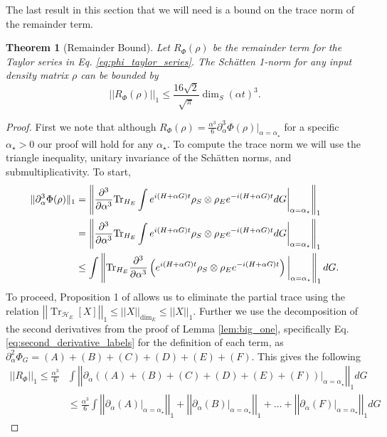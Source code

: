 \documentclass{article}
\newtheorem{theorem}{Theorem}
\newcommand{\brackets}[1]{\left[ #1 \right]}
\newcommand{\norm}[1]{\left| \left| #1 \right| \right|}
\DeclareMathOperator{\Tr}{Tr}
\newcommand{\partrace}[2]{\Tr_{#1} \brackets{ #2 }}
\newcommand{\hilb}{\mathcal{H}}
\begin{document}
The last result in this section that we will need is a bound on the trace norm of the remainder term.
\begin{theorem}[Remainder Bound] \label{lem:remainder_bound}
    Let $R_{\Phi}(\rho)$ be the remainder term for the Taylor series in Eq. \eqref{eq:phi_taylor_series}. The Sch\"{a}tten 1-norm for any input density matrix $\rho$ can be bounded by
    \begin{equation}
        \norm{R_{\Phi}(\rho)}_1 \le \frac{16 \sqrt{2}}{\sqrt{\pi}} \dim_S (\alpha t)^3.
    \end{equation}
\end{theorem}
\begin{proof}
First we note that although $R_{\Phi}(\rho) = \frac{\alpha^3}{6} \partial_{\alpha}^3 \Phi(\rho)\big|_{\alpha = \alpha_{\star}}$ for a specific $ \alpha_{\star} > 0$ our proof will hold for any $\alpha_{\star}$. To compute the trace norm we will use the triangle inequality, unitary invariance of the Sch\"{a}tten norms, and submultiplicativity. To start,
\begin{align}
    \|\partial_\alpha^3 \Phi(\rho) \|_1 &= \left\| \frac{\partial^3}{\partial \alpha^3} {\rm Tr}_{H_E} \int e^{i(H+\alpha G)t} \rho_S \otimes \rho_E e^{-i(H+\alpha G)t} dG \bigg|_{\alpha = \alpha_{\star}} \right\|_1 \nonumber\\
    &= \left\| \frac{\partial^3}{\partial \alpha^3} {\rm Tr}_{H_E} \int e^{i(H+\alpha G)t} \rho_S \otimes \rho_E e^{-i(H+\alpha G)t} dG \bigg|_{\alpha = \alpha_{\star}} \right\|_1 \nonumber\\
    &\le    \int \left\|{\rm Tr}_{H_E}\frac{\partial^3}{\partial \alpha^3}\left( e^{i(H+\alpha G)t} \rho_S \otimes \rho_E e^{-i(H+\alpha G)t}\right) \bigg|_{\alpha = \alpha_{\star}} \right\|_1 dG.\label{eq:3derivBd}
\end{align}
To proceed, Proposition 1 of \cite{rastegin2012relations} allows us to eliminate the partial trace using the relation
$\norm{\partrace{\hilb_E}{X}}_{1} \le \norm{X}_{\dim_E} \le \norm{X}_1$. Further we use the decomposition of the second derivatives from the proof of Lemma \ref{lem:big_one}, specifically Eq. \eqref{eq:second_derivative_labels} for the definition of each term, as $\partial_{\alpha}^2 \Phi_G = (A) + (B) + (C) + (D) +(E) + (F)$. This gives the following 
\begin{align}
    \norm{R_{\Phi}}_1 \le \frac{\alpha^3}{6} &\int \norm{\partial_{\alpha}((A) + (B) + (C) + (D) +(E) + (F)) \big|_{\alpha = \alpha_{\star}} }_1 dG \\
    &\le \frac{\alpha^3}{6} \int \norm{\partial_{\alpha}(A)\big|_{\alpha = \alpha_{\star}} }_1 + \norm{\partial_{\alpha}(B) \big|_{\alpha = \alpha_{\star}} }_1 + \ldots + \norm{\partial_{\alpha}(F) \big|_{\alpha = \alpha_{\star}} }_1 dG

\end{align}
\end{proof}
\end{document}
